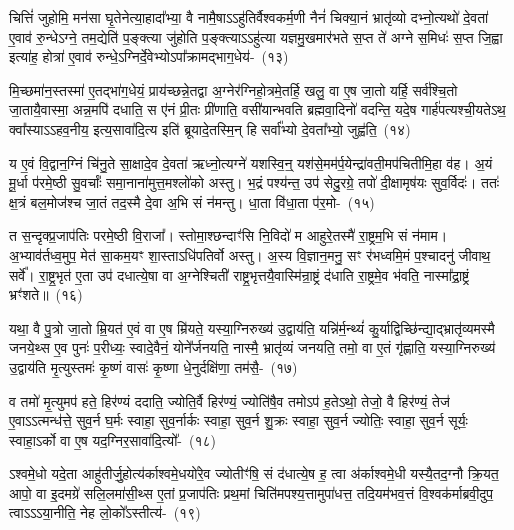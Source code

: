 {\anuvakamend[{उपै॒तान्धारा॑यै॒ षट्च॑त्वारिꣳशच्च}]}

चित्तिं॑ जुहोमि॒ मन॑सा घृ॒तेनेत्या॒हादा᳚भ्या॒ वै नामै॒षा\-ऽऽहु॑तिर्वैश्वकर्म॒णी नैनं॑ चिक्या॒नं भ्रातृ॑व्यो दभ्नो॒त्यथो॑ दे॒वता॑ ए॒वाव॑ रु॒न्धे\-ऽग्ने॒ तम॒द्येति॑ प॒ङ्क्त्या जु॑होति प॒ङ्क्त्या\-ऽऽहु॑त्या यज्ञमु॒खमार॑भते स॒प्त ते॑ अग्ने स॒मिधः॑ स॒प्त जि॒ह्वा इत्या॑ह॒ होत्रा॑ ए॒वाव॑ रुन्धे॒\-ऽग्निर्दे॒वेभ्यो\-ऽपा᳚क्रामद्भाग॒\-धेय॑-~(१३)\ip

मि॒च्छमा॑न॒स्तस्मा॑ ए॒तद्भा॑ग॒धेयं॒ प्राय॑च्छन्ने॒तद्वा अ॒ग्नेर॑ग्निहो॒त्रमे॒तर्\mbox{}हि॒ खलु॒ वा ए॒ष जा॒तो यर्\mbox{}हि॒ सर्व॑श्चि॒तो जा॒तायै॒वास्मा॒ अन्न॒मपि॑ दधाति॒ स ए॑नं प्री॒तः प्री॑णाति॒ वसी॑यान्भवति ब्रह्मवा॒दिनो॑ वदन्ति॒ यदे॒ष गार्\mbox{}ह॑पत्यश्ची॒यते\-ऽथ॒ क्वा᳚स्या\-ऽऽहव॒नीय॒ इत्य॒सावा॑दि॒त्य इति॑ ब्रूयादे॒तस्मि॒न् हि सर्वा᳚भ्यो दे॒वता᳚भ्यो॒ जुह्व॑ति॒~(१४)\ip

य ए॒वं वि॒द्वान॒ग्निं चि॑नु॒ते सा॒क्षादे॒व दे॒वता॑ ऋध्नो॒त्यग्ने॑ यशस्वि॒न्॒ यश॑से॒मम॑र्प॒येन्द्रा॑वती॒मप॑\-चितीमि॒हा व॑ह। अ॒यं मू॒र्धा प॑रमे॒ष्ठी सु॒वर्चाः᳚ समा॒नाना॑मुत्त॒मश्लो॑को अस्तु। भ॒द्रं पश्य॑न्त॒ उप॑ सेदु॒रग्रे॒ तपो॑ दी॒क्षामृष॑यः सुव॒र्विदः॑। ततः॑ क्ष॒त्रं बल॒मोज॑श्च जा॒तं तद॒स्मै दे॒वा अ॒भि सं न॑मन्तु। धा॒ता वि॑धा॒ता प॑र॒मो-~(१५)\ip

त स॒न्दृक्प्र॒जा\-प॑तिः परमे॒ष्ठी वि॒राजा᳚। स्तोमा॒श्छन्दाꣳ॑सि नि॒विदो॑ म आहुरे॒तस्मै॑ रा॒ष्ट्रम॒भि सं न॑माम। अ॒भ्याव॑र्तध्व॒मुप॒ मेत॑ सा॒कम॒यꣳ शा॒स्ता\-ऽधि॑\-पतिर्वो अस्तु। अ॒स्य वि॒ज्ञान॒मनु॒ सꣳ र॑भध्वमि॒मं प॒श्चादनु॑ जीवाथ॒ सर्वे᳚। रा॒ष्ट्र॒भृत॑ ए॒ता उप॑ दधात्ये॒षा वा अ॒ग्नेश्चिती॑ राष्ट्र॒भृत्तयै॒वास्मि॑न्रा॒ष्ट्रं द॑धाति रा॒ष्ट्रमे॒व भ॑वति॒ नास्मा᳚द्रा॒ष्ट्रं भ्रꣳ॑शते॥~(१६)\ip

{\anuvakamend[{भा॒ग॒धेय॒ञ्जुह्व॑ति पर॒मा रा॒ष्ट्रं द॑धाति स॒प्त च॑}]}

यथा॒ वै पु॒त्रो जा॒तो म्रि॒यत॑ ए॒वं वा ए॒ष म्रि॑यते॒ यस्या॒ग्निरुख्य॑ उ॒द्वाय॑ति॒ यन्नि॑र्म॒न्थ्यं॑ कु॒र्याद्विच्छि॑न्द्या॒द्भ्रातृ॑व्यमस्मै जनये॒थ्स ए॒व पुनः॑ प॒रीध्यः॒ स्वादे॒वैनं॒ योने᳚र्जनयति॒ नास्मै॒ भ्रातृ॑व्यं जनयति॒ तमो॒ वा ए॒तं गृ॑ह्णाति॒ यस्या॒ग्निरुख्य॑ उ॒द्वाय॑ति मृ॒त्युस्तमः॑ कृ॒ष्णं वासः॑ कृ॒ष्णा धे॒नुर्दक्षि॑णा॒ तम॑सै॒-~(१७)\ip

व तमो॑ मृ॒त्युमप॑ हते॒ हिर॑ण्यं ददाति॒ ज्योति॒र्वै हिर॑ण्यं॒ ज्योति॑षै॒व तमो\-ऽप॑ ह॒ते\-ऽथो॒ तेजो॒ वै हिर॑ण्यं॒ तेज॑ ए॒वा\-ऽऽ\-त्मन्ध॑त्ते॒ सुव॒र्न घ॒र्मः स्वाहा॒ सुव॒र्नार्कः स्वाहा॒ सुव॒र्न शु॒क्रः स्वाहा॒ सुव॒र्न ज्योतिः॒ स्वाहा॒ सुव॒र्न सूर्यः॒ स्वाहा॒\-ऽर्को वा ए॒ष यद॒ग्निर॒सावा॑दि॒त्यो᳚-~(१८)\ip

ऽश्वमे॒धो यदे॒ता आहु॑तीर्जु॒होत्य॑र्काश्वमे॒धयो॑रे॒व ज्योतीꣳ॑षि॒ सं द॑धात्ये॒ष ह॒ त्वा अ॑र्का\-श्वमे॒धी यस्यै॒तद॒ग्नौ क्रि॒यत॒ आपो॒ वा इ॒दमग्रे॑ सलि॒लमा॑सी॒थ्स ए॒तां प्र॒जा\-प॑तिः प्रथ॒मां चिति॑\-मपश्य॒त्तामुपा॑धत्त॒ तदि॒यम॑भव॒त्तं वि॒श्वक॑र्माब्रवी॒दुप॒ त्वा\-ऽऽ\-ऽया॒नीति॒ नेह लो॒को᳚\-ऽस्तीत्य॑-~(१९)\ip

